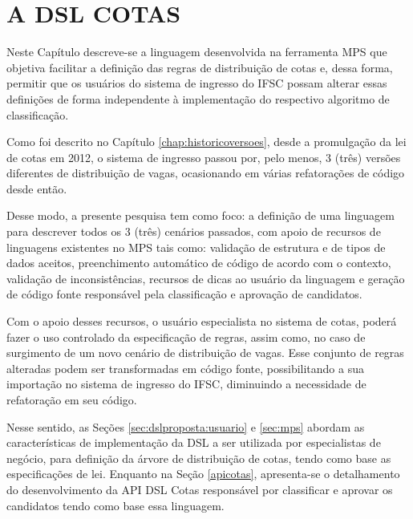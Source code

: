 \chapter{A DSL COTAS}
\label{chap:dslcotas}

   Neste Capítulo descreve-se a linguagem desenvolvida na ferramenta \gls{MPS} que objetiva facilitar a definição das regras de distribuição de cotas e, dessa forma, permitir que os usuários do sistema de ingresso do \gls{IFSC} possam alterar essas definições de forma independente à implementação do respectivo algoritmo de classificação.
   
   Como foi descrito no Capítulo \ref{chap:historicoversoes}, desde a promulgação da lei de cotas em 2012, o sistema de ingresso passou por, pelo menos, 3 (três) versões diferentes de distribuição de vagas, ocasionando em várias refatorações de código desde então. 
   
   Desse modo, a presente pesquisa tem como foco: a definição de uma linguagem para descrever todos os 3 (três) cenários passados, com apoio de recursos de linguagens existentes no \gls{MPS} tais como: validação de estrutura e de tipos de dados aceitos, preenchimento automático de código de acordo com o contexto, validação de inconsistências, recursos de dicas ao usuário da linguagem e geração de código fonte responsável pela classificação e aprovação de candidatos. 
   
   Com o apoio desses recursos, o usuário especialista no sistema de cotas, poderá fazer o uso controlado da especificação de regras, assim como, no caso de surgimento de um novo cenário de distribuição de vagas. Esse conjunto de regras alteradas podem ser transformadas em código fonte, possibilitando a  sua importação no sistema de ingresso do \gls{IFSC}, diminuindo a necessidade de refatoração em seu código.
   
   Nesse sentido, as Seções \ref{sec:dslproposta:usuario} e \ref{sec:mps} abordam as características de implementação da \gls{DSL} a ser utilizada por especialistas de negócio, para definição da árvore de distribuição de cotas, tendo como base as especificações de lei. Enquanto na Seção \ref{apicotas}, apresenta-se o detalhamento do desenvolvimento da \gls{API} DSL Cotas responsável por classificar e aprovar os candidatos tendo como base essa linguagem.
   
  
   

   
 
